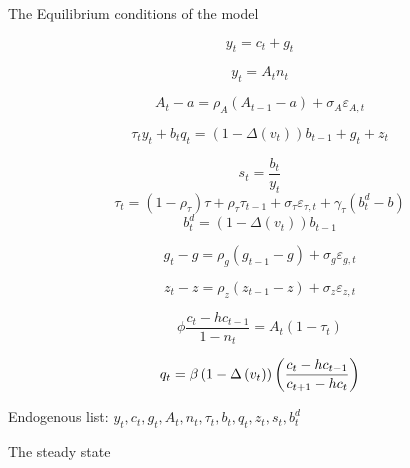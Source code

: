 \documentclass{article}
\begin{document}
The Equilibrium conditions of the model

\begin{equation}
y_{t}=c_{t}+g_{t}
\end{equation}

\begin{equation}
y_{t}=A_{t}n_{t}
\end{equation}

\begin{equation}
A_{t}-a=\rho _{A}\left( A_{t-1}-a\right) +\sigma _{A}\varepsilon _{A,t}
\end{equation}

\begin{equation}
\tau _{t}y_{t}+b_{t}q_{t}=\left( 1-\Delta \left( v_{t}\right) \right)
b_{t-1}+g_{t}+z_{t}
\end{equation}

\begin{equation}
s_{t}=\frac{b_{t}}{y_{t}}
\end{equation}%
\begin{equation}
\tau _{t}=\left( 1-\rho _{\tau }\right) \tau +\rho _{\tau }\tau
_{t-1}+\sigma _{\tau }\varepsilon _{\tau ,t}+\gamma _{\tau }\left(
b_{t}^{d}-b\right)
\end{equation}%
\begin{equation}
b_{t}^{d}=\left( 1-\Delta \left( v_{t}\right) \right) b_{t-1}
\end{equation}

\begin{equation}
g_{t}-g=\rho _{g}\left( g_{t-1}-g\right) +\sigma _{g}\varepsilon _{g,t}
\end{equation}

\begin{equation}
z_{t}-z=\rho _{z}\left( z_{t-1}-z\right) +\sigma _{z}\varepsilon _{z,t}
\end{equation}

\begin{equation}
\phi \frac{c_{t}-hc_{t-1}}{1-n_{t}}=A_{t}\left( 1-\tau _{t}\right)
\end{equation}

\begin{equation}
q_{t}=\beta \left( 1-\Delta \left( v_{t}\right) \right) \left( \frac{%
c_{t}-hc_{t-1}}{c_{t+1}-hc_{t}}\right) 
\end{equation}

Endogenous list: $y_{t},c_{t},g_{t},A_{t},n_{t},\tau
_{t},b_{t},q_{t},z_{t},s_{t},b_{t}^{d}$

The steady state
\end{document}
